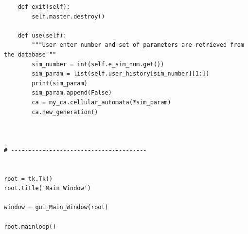\documentclass[11pt, a4paper]{article}
\begin{document}
\begin{lstlisting}
    def exit(self):
        self.master.destroy()

    def use(self):
        """User enter number and set of parameters are retrieved from the database"""
        sim_number = int(self.e_sim_num.get())
        sim_param = list(self.user_history[sim_number][1:])
        print(sim_param)
        sim_param.append(False)
        ca = my_ca.cellular_automata(*sim_param)
        ca.new_generation()



# ---------------------------------------


root = tk.Tk()
root.title('Main Window')

window = gui_Main_Window(root)

root.mainloop()
    

\end{lstlisting}
\end{document}

